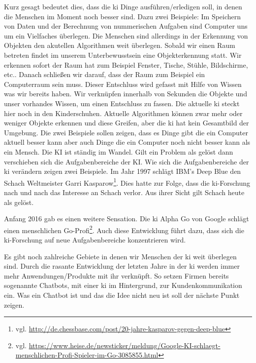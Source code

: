 Kurz gesagt bedeutet dies, dass die \ac{ki} Dinge ausführen/erledigen soll, in denen die Menschen im Moment noch besser sind. Dazu zwei Beispiele: \newline
Im Speichern von Daten und der Berechnung von nummerischen Aufgaben sind Computer uns um ein Vielfaches überlegen. \newline
 Die Menschen sind allerdings in der Erkennung von Objekten den akutellen Algorithmen weit überlegen. Sobald wir einen Raum betreten findet im unserem Unterbewusstsein eine Objekterkennung statt. Wir erkennen sofort der Raum hat zum Beispiel Fenster, Tische, Stühle, Bildschirme, etc.. Danach schließen wir darauf, dass der Raum zum Beispiel ein Computerraum sein muss. Dieser Entschluss wird gefasst mit Hilfe von Wissen was wir bereits haben. Wir verknüpfen innerhalb von Sekunden die Objekte und unser vorhandes Wissen, um einen Entschluss zu fassen. Die aktuelle \ac{ki} steckt hier noch in den Kinderschuhen. Aktuelle Algorithmen können zwar mehr oder weniger Objekte erkennen und diese Greifen, aber die \ac{ki} hat kein Gesamtbild der Umgebung. Die zwei Beispiele sollen zeigen, dass es Dinge gibt die ein Computer aktuell besser kann aber auch Dinge die ein Computer noch nicht besser kann als ein Mensch. Die KI ist ständig im Wandel. Gilt ein Problem als gelöst dann verschieben sich die Aufgabenbereiche der KI.   
Wie sich die Aufgabenbereiche der \ac{ki} verändern zeigen zwei Beispiele. Im Jahr 1997 schlägt IBM's Deep Blue den Schach Weltmeister Garri Kasparow\footnote{vgl. \url{http://de.chessbase.com/post/20-jahre-kasparov-gegen-deep-blue}}. Dies hatte zur Folge, dass die \ac{ki}-Forschung nach und nach das Interesse an Schach verlor. Aus ihrer Sicht gilt Schach heute als gelöst. 

Anfang 2016 gab es einen weitere Sensation. Die \ac{ki} Alpha Go von Google schlägt einen menschlichen Go-Profi\footnote{vgl. \url{https://www.heise.de/newsticker/meldung/Google-KI-schlaegt-menschlichen-Profi-Spieler-im-Go-3085855.html}}. Auch diese Entwicklung führt dazu, dass sich die \ac{ki}-Forschung auf neue Aufgabenbereiche konzentrieren wird. 

Es gibt noch zahlreiche Gebiete in denen wir Menschen der \ac{ki} weit überlegen sind. Durch die rasante Entwicklung der letzten Jahre in der \ac{ki} werden immer mehr Anwendungen/Produkte mit ihr verknüpft. So setzen Firmen bereits sogenannte Chatbots, mit einer \ac{ki} im Hintergrund, zur Kundenkommunikation ein. Was ein Chatbot ist und das die Idee nicht neu ist soll der nächste Punkt zeigen. 

